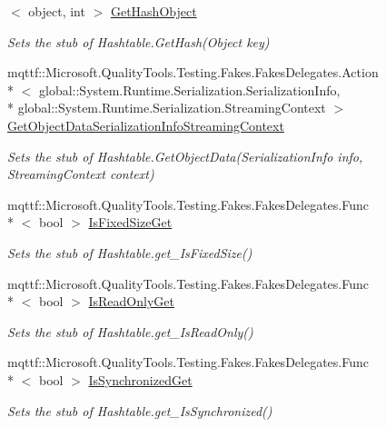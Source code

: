 \begin{DoxyCompactItemize}
$<$ object, int $>$ \hyperlink{class_system_1_1_collections_1_1_fakes_1_1_stub_hashtable_aa30b589cd4bb4dc5c09705199d73ae8a}{Get\-Hash\-Object}
\begin{DoxyCompactList}\small\item\em Sets the stub of Hashtable.\-Get\-Hash(\-Object key)\end{DoxyCompactList}\item 
mqttf\-::\-Microsoft.\-Quality\-Tools.\-Testing.\-Fakes.\-Fakes\-Delegates.\-Action\\*
$<$ global\-::\-System.\-Runtime.\-Serialization.\-Serialization\-Info, \\*
global\-::\-System.\-Runtime.\-Serialization.\-Streaming\-Context $>$ \hyperlink{class_system_1_1_collections_1_1_fakes_1_1_stub_hashtable_a699d4b82c1710dfca21b60a80fcc3743}{Get\-Object\-Data\-Serialization\-Info\-Streaming\-Context}
\begin{DoxyCompactList}\small\item\em Sets the stub of Hashtable.\-Get\-Object\-Data(\-Serialization\-Info info, Streaming\-Context context)\end{DoxyCompactList}\item 
mqttf\-::\-Microsoft.\-Quality\-Tools.\-Testing.\-Fakes.\-Fakes\-Delegates.\-Func\\*
$<$ bool $>$ \hyperlink{class_system_1_1_collections_1_1_fakes_1_1_stub_hashtable_a48617c1b883808631b14644d1a56867b}{Is\-Fixed\-Size\-Get}
\begin{DoxyCompactList}\small\item\em Sets the stub of Hashtable.\-get\-\_\-\-Is\-Fixed\-Size()\end{DoxyCompactList}\item 
mqttf\-::\-Microsoft.\-Quality\-Tools.\-Testing.\-Fakes.\-Fakes\-Delegates.\-Func\\*
$<$ bool $>$ \hyperlink{class_system_1_1_collections_1_1_fakes_1_1_stub_hashtable_a70bcec3288ddeff08a1abc6b91ae2aa6}{Is\-Read\-Only\-Get}
\begin{DoxyCompactList}\small\item\em Sets the stub of Hashtable.\-get\-\_\-\-Is\-Read\-Only()\end{DoxyCompactList}\item 
mqttf\-::\-Microsoft.\-Quality\-Tools.\-Testing.\-Fakes.\-Fakes\-Delegates.\-Func\\*
$<$ bool $>$ \hyperlink{class_system_1_1_collections_1_1_fakes_1_1_stub_hashtable_aab9f6cdcddb5299c5f8bd6aca7f85872}{Is\-Synchronized\-Get}
\begin{DoxyCompactList}\small\item\em Sets the stub of Hashtable.\-get\-\_\-\-Is\-Synchronized()\end{DoxyCompactList}\item 

\end{DoxyCompactItemize}
